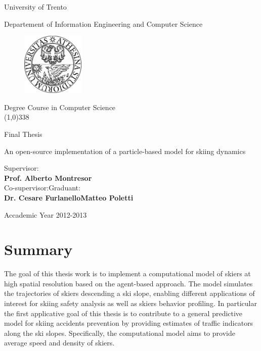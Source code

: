 \documentclass[12pt,a4paper,twoside]{book}
\begin{document}
\begin{titlepage}
  \begin{center}
    \begin{Large}University of Trento\\\end{Large}
     Departement of Information Engineering and Computer Science  \\
     \vspace{10pt}
     \begin{figure}[htbp]
       \begin{center}
         \includegraphics[width=3cm]{images/unitn.eps}
       \end{center}
     \end{figure}
Degree Course in Computer Science\\

\vspace{10pt}
\line(1,0){338}
\vspace{10pt}

Final Thesis\\
\end{center}
\vspace{3cm}
\begin{center}
\begin{Large}An open-source implementation of a particle-based model for skiing dynamics\\\end{Large}
\vspace{3cm}
\end{center}
Supervisor: \\ \textbf{Prof. Alberto Montresor} \\
Co-supervisor:\hspace{8.15cm}Graduant:   \\
\textbf{Dr. Cesare Furlanello}\hspace{6.3cm}\textbf{Matteo Poletti}
\vspace{1cm}
\begin{center}
Accademic Year 2012-2013
\end{center}
\end{titlepage}

\chapter*{Summary}
The goal of this thesis work is to implement a computational model of skiers at high spatial resolution based on the agent-based approach. The model simulates the trajectories of skiers descending a ski slope, enabling different applications of interest for skiing safety analysis as well as skiers behavior profiling. In particular the first applicative goal of this thesis is to contribute to a general predictive model for skiing accidents prevention by providing estimates of traffic indicators along the ski slopes. Specifically, the computational model aims to provide average speed and density of skiers.
\end{document}
